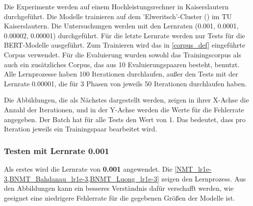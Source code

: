 Die Experimente werden auf einem Hochleistungsrechner in Kaiserslautern durchgeführt. Die Modelle trainieren auf dem 'Elweritsch'-Cluster (\cite{AHRP:2022}) im TU Kaiserslautern. Die Untersuchungen werden mit den Lernraten (0.001, 0.0001, 0.00002, 0.00001) durchgeführt. Für die letzte Lernrate werden nur Tests für die BERT-Modelle ausgeführt. Zum Trainieren wird das in \cref{corpus_def} eingeführte Corpus verwendet. Für die Evaluierung wurden sowohl das Trainingscorpus als auch ein zusätzliches Corpus, das aus 10 Evaluierungspaaren besteht, benutzt. Alle Lernprozesse haben 100 Iterationen durchlaufen, außer den Tests mit der Lernrate 0.00001, die für 3 Phasen von jeweils 50 Iterationen durchlaufen haben.

Die Abbildungen, die als Nächstes dargestellt werden, zeigen in ihrer X-Achse die Anzahl der Iterationen, und in der Y-Achse werden die Werte für die Fehlerrate angegeben. Der Batch hat für alle Tests den Wert von 1. Das bedeutet, dass pro Iteration jeweils ein Trainingspaar bearbeitet wird.

\subsubsection{Testen mit Lernrate 0.001}
Als erstes wird die Lernrate von \textbf{0.001} angewendet. Die \cref{NMT_lr1e-3,BNMT_Bahdanau_lr1e-3,BNMT_Luong_lr1e-3} zeigen den Lernprozess. Aus den Abbildungen kann ein besseres Verständnis dafür verschafft werden, wie geeignet eine niedrigere Fehlerrate für die gegebenen Größen der Modelle ist.


